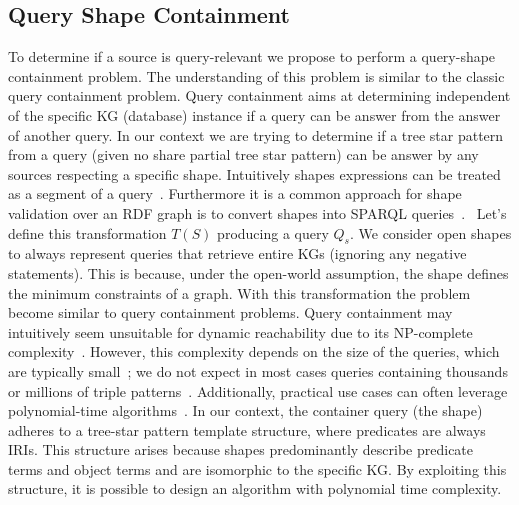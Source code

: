 \subsection{Query Shape Containment}\label{sec:containment}

To determine if a source is query-relevant we propose to perform a query-shape containment problem.
The understanding of this problem is similar to the classic query containment problem. 
Query containment aims at determining independent of the specific KG (database) instance if a query can be answer from the answer of another query.
In our context we are trying to determine if a tree star pattern from a query (given no share partial tree star pattern) can be answer by any sources respecting a specific shape.
Intuitively shapes expressions can be treated as a segment of a query~\cite{delva2023}.
Furthermore it is a common approach for shape validation over an RDF graph is to convert shapes into SPARQL queries~\cite{labragayo2017validatingdescribinglinkeddata, Corman2019,Prestamo2023, spapeExpressionConvert}.~
Let's define this transformation $T(S)$ producing a query $Q_s$.
We consider open shapes to always represent queries that retrieve entire KGs (ignoring any negative statements). 
This is because, under the open-world assumption, the shape defines the minimum constraints of a graph.
With this transformation the problem become similar to query containment problems.
Query containment may intuitively seem unsuitable for dynamic reachability due to its NP-complete complexity~\cite{Spasi2023}.
However, this complexity depends on the size of the queries, which are typically small~\cite{Doan2012}; we do not expect in most cases queries containing thousands or millions of triple patterns~\cite{Bonifati2019}.
Additionally, practical use cases can often leverage polynomial-time algorithms~\cite{Doan2012}.
In our context, the container query (the shape) adheres to a tree-star pattern template structure, where predicates are always IRIs.
This structure arises because shapes predominantly describe predicate terms and object terms and are isomorphic to the specific KG.
By exploiting this structure, it is possible to design an algorithm with polynomial time complexity.

